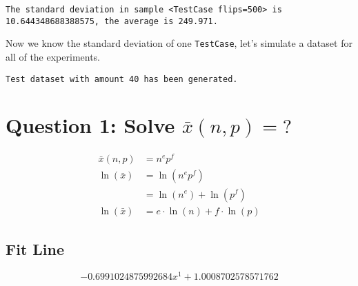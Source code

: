 \documentclass{article}
\begin{document}
    \begin{Verbatim}[commandchars=\\\{\}]

\end{Verbatim}

    \begin{Verbatim}[commandchars=\\\{\}]
The standard deviation in sample <TestCase flips=500> is 10.644348688388575, the average is 249.971.

    \end{Verbatim}

    Now we know the standard deviation of one \texttt{TestCase}, let's
simulate a dataset for all of the experiments.

    \begin{Verbatim}[commandchars=\\\{\}]
Test dataset with amount 40 has been generated.

    \end{Verbatim}

    \section{\texorpdfstring{Question 1: Solve
\(\bar{x}(n, p) = ?\)}{Question 1: Solve \textbackslash{}bar\{x\}(n, p) = ?}}\label{question-1-solve-barxn-p}

\begin{align}
\bar{x}(n, p) & = n^ep^f \\
  \ln(\bar{x}) & = \ln(n^ep^f) \\
              & = \ln(n^e) + \ln(p^f) \\
  \ln(\bar{x}) & = e \cdot \ln(n) + f \cdot \ln(p)
\end{align}

    \subsection{Fit Line}\label{fit-line}

    
    $$-0.6991024875992684x^1+1.0008702578571762$$

    
    \begin{center}
    \end{center}
    { \hspace*{\fill} \\}
    
\end{document}

